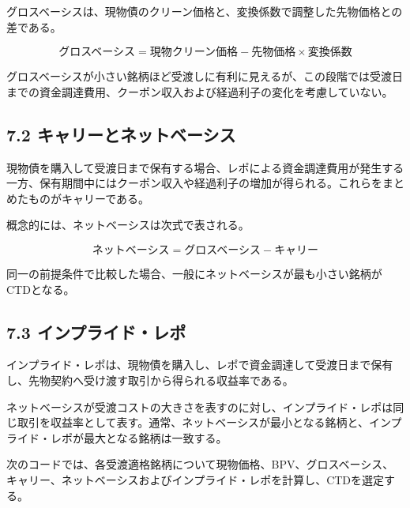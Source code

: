 \documentclass[
  letterpaper,
  DIV=11,
  numbers=noendperiod]{scrreprt}
\begin{document}
グロスベーシスは、現物債のクリーン価格と、変換係数で調整した先物価格との差である。

\[
\text{グロスベーシス}
=
\text{現物クリーン価格}
-
\text{先物価格}
\times
\text{変換係数}
\]

グロスベーシスが小さい銘柄ほど受渡しに有利に見えるが、この段階では受渡日までの資金調達費用、クーポン収入および経過利子の変化を考慮していない。

\subsection{7.2
キャリーとネットベーシス}\label{ux30adux30e3ux30eaux30fcux3068ux30cdux30c3ux30c8ux30d9ux30fcux30b7ux30b9}

現物債を購入して受渡日まで保有する場合、レポによる資金調達費用が発生する一方、保有期間中にはクーポン収入や経過利子の増加が得られる。これらをまとめたものがキャリーである。

概念的には、ネットベーシスは次式で表される。

\[
\text{ネットベーシス}
=
\text{グロスベーシス}
-
\text{キャリー}
\]

同一の前提条件で比較した場合、一般にネットベーシスが最も小さい銘柄がCTDとなる。

\subsection{7.3
インプライド・レポ}\label{ux30a4ux30f3ux30d7ux30e9ux30a4ux30c9ux30ecux30dd}

インプライド・レポは、現物債を購入し、レポで資金調達して受渡日まで保有し、先物契約へ受け渡す取引から得られる収益率である。

ネットベーシスが受渡コストの大きさを表すのに対し、インプライド・レポは同じ取引を収益率として表す。通常、ネットベーシスが最小となる銘柄と、インプライド・レポが最大となる銘柄は一致する。

次のコードでは、各受渡適格銘柄について現物価格、BPV、グロスベーシス、キャリー、ネットベーシスおよびインプライド・レポを計算し、CTDを選定する。
\end{document}
